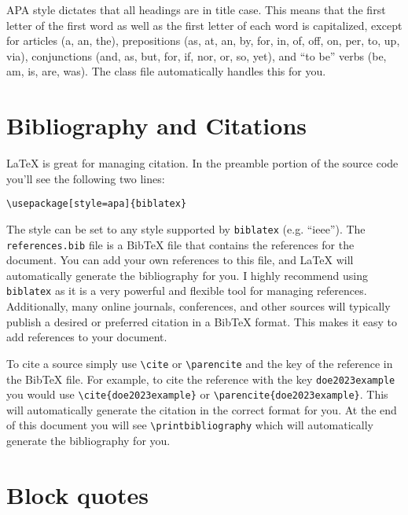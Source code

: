 \documentclass{thesis-dissertation}
\begin{document}
APA style dictates that all headings are in title case. This means that the first letter of the first word as well as the first letter of each word is capitalized, except for articles (a, an, the), prepositions (as, at, an, by, for, in, of, off, on, per, to, up, via), conjunctions (and, as, but, for, if, nor, or, so, yet), and ``to be'' verbs (be, am, is, are, was). The class file automatically handles this for you.

\section{Bibliography and Citations}
\LaTeX{} is great for managing citation. In the preamble portion of the source code you'll see the following two lines: \begin{center}
  \verb|\usepackage[style=apa]{biblatex}| \\
  \verb||
\end{center} 

The style can be set to any style supported by \texttt{biblatex} (e.g. ``ieee''). The \texttt{references.bib} file is a BibTeX file that contains the references for the document. You can add your own references to this file, and \LaTeX{} will automatically generate the bibliography for you. I highly recommend using \texttt{biblatex} as it is a very powerful and flexible tool for managing references. Additionally, many online journals, conferences, and other sources will typically publish a desired or preferred citation in a BibTeX format. This makes it easy to add references to your document. 

To cite a source simply use \verb|\cite| or \verb|\parencite| and the key of the reference in the BibTeX file. For example, to cite the reference with the key \texttt{doe2023example} you would use \verb|\cite{doe2023example}| or \verb|\parencite{doe2023example}|. This will automatically generate the citation in the correct format for you. At the end of this document you will see \verb|\printbibliography| which will automatically generate the bibliography for you. 

\section{Block quotes}
\end{document}
